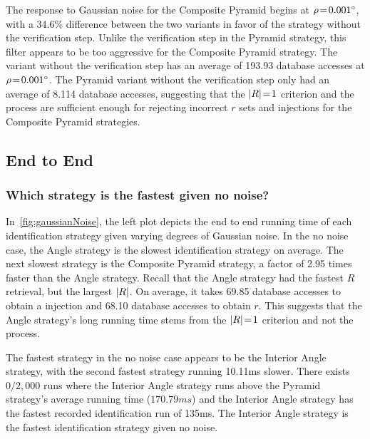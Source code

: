 The response to Gaussian noise for the Composite Pyramid begins at $\rho\!=\!\ang{0.001}$, with a 34.6\% difference
between the two variants in favor of the strategy without the verification step.
Unlike the verification step in the Pyramid strategy, this filter appears to be too aggressive for the Composite Pyramid
strategy.
The variant without the verification step has an average of 193.93 database accesses at $\rho\!=\!\ang{0.001}$.
The Pyramid variant without the verification step only had an average of 8.114 database accesses, suggesting that the
$\left| R \right| \!=\! 1$ criterion and the  process are sufficient enough for rejecting incorrect $r$ sets and
injections for the Composite Pyramid strategies.

\subsection{End to End}\label{subsec:endToEndEvaluation}
\subsubsection{Which strategy is the fastest given no noise?}
In~\autoref{fig:gaussianNoise}, the left plot depicts the end to end running time of each identification strategy given
varying degrees of Gaussian noise.
In the no noise case, the Angle strategy is the slowest identification strategy on average.
The next slowest strategy is the Composite Pyramid strategy, a factor of 2.95 times faster than the Angle strategy.
Recall that the Angle strategy had the fastest $R$ retrieval, but the largest $\left| R \right|$.
On average, it takes 69.85 database accesses to obtain a injection and 68.10 database accesses to obtain $r$.
This suggests that the Angle strategy's long running time stems from the $\left| R \right| \!=\! 1$ criterion and not the
 process.

The fastest strategy in the no noise case appears to be the Interior Angle strategy, with the second fastest strategy
running 10.11\si{ms} slower.
There exists $0 / 2{,}000$ runs where the Interior Angle strategy runs above the Pyramid strategy's average running time
($170.79\si{ms}$) and the Interior Angle strategy has the fastest recorded identification run of 135ms.
The Interior Angle strategy is the fastest identification strategy given no noise.

